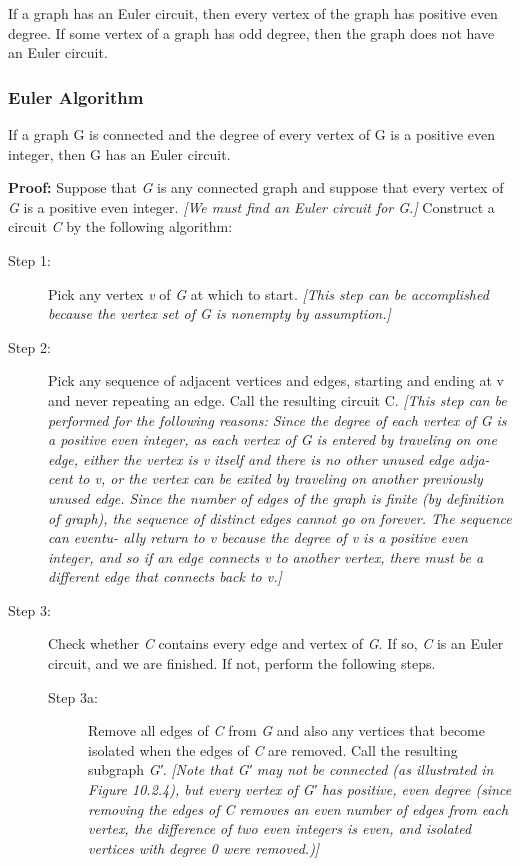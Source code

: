 \documentclass{article}
\begin{document}
If a graph has an Euler circuit, then every vertex of the graph has positive even degree. If some vertex of a graph has odd degree, then the graph does not have an Euler circuit.

\subsubsection{Euler Algorithm}
If a graph G is connected and the degree of every vertex of G is a positive even integer, then G has an Euler circuit.

\noindent
\textbf{Proof: }
Suppose that \textit{G} is any connected graph and suppose that every vertex of \textit{G} is a positive even integer. \textit{[We must find an Euler circuit for G.]} Construct a circuit \textit{C} by the following algorithm:
\begin{description}
\item[Step 1: ] Pick any vertex \textit{v} of \textit{G} at which to start.
\textit{[This step can be accomplished because the vertex set of G is nonempty by assumption.]}

\item[Step 2: ] Pick any sequence of adjacent vertices and edges, starting and ending at v and never repeating an edge. Call the resulting circuit C.
\textit{[This step can be performed for the following reasons: Since the degree of each vertex of G is a positive even integer, as each vertex of G is entered by traveling on one edge, either the vertex is v itself and there is no other unused edge adja- cent to v, or the vertex can be exited by traveling on another previously unused edge. Since the number of edges of the graph is finite (by definition of graph), the sequence of distinct edges cannot go on forever. The sequence can eventu- ally return to v because the degree of v is a positive even integer, and so if an edge connects v to another vertex, there must be a different edge that connects back to v.]}

\item[Step 3: ] Check whether \textit{C} contains every edge and vertex of \textit{G}. If so, \textit{C} is an Euler circuit, and we are finished. If not, perform the following steps.

    \begin{description}
    \item[Step 3a: ] Remove all edges of \textit{C} from \textit{G} and also any vertices that become isolated when the edges of \textit{C} are removed. Call the resulting subgraph \textit{G′}.
    \textit{[Note that G′ may not be connected (as illustrated in Figure 10.2.4), but every vertex of G′ has positive, even degree (since removing the edges of C removes an even number of edges from each vertex, the difference of two even integers is even, and isolated vertices with degree 0 were removed.)]}


\end{description}
\end{description}
\end{document}
